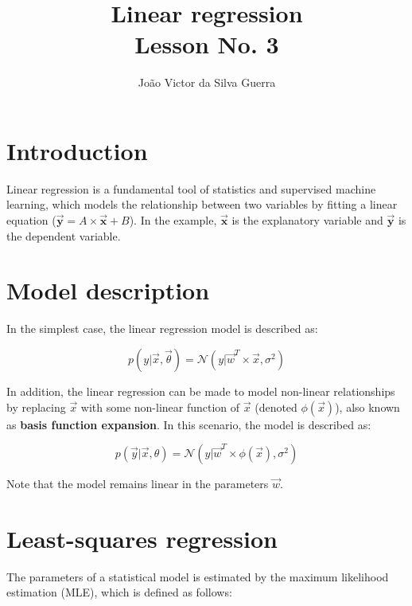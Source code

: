 \documentclass{article}
\begin{document}
\title{Linear regression\\\normalsize Lesson No. 3}
\author{Jo\~ao Victor da Silva Guerra}

\maketitle

\section{Introduction}

Linear regression is a fundamental tool of statistics and supervised machine learning, which models the relationship between two variables by fitting a linear equation ($\vec{\textbf{y}} = A \times \vec{\textbf{x}} + B$). In the example, $\vec{\textbf{x}}$ is the explanatory variable and $\vec{\textbf{y}}$ is the dependent variable.

\section{Model description}

In the simplest case, the linear regression model is described as:

\begin{equation}
  p(y|\vec{x},\vec{\theta}) = \mathcal{N} (y| \vec{w}^T \times \vec{x}, \sigma^2)
\end{equation}

In addition, the linear regression can be made to model non-linear relationships by replacing $\vec{x}$ with some non-linear function of $\vec{x}$ (denoted $\phi(\vec{x})$), also known as \textbf{basis function expansion}. In this scenario, the model is described as:

\begin{equation}
  p(\vec{y}|\vec{x},\theta) = \mathcal{N} (y|\vec{w}^T \times \phi(\vec{x}), \sigma^2)
\end{equation}

Note that the model remains linear in the parameters $\vec{w}$.

\section{Least-squares regression}

The parameters of a statistical model is estimated by the maximum likelihood estimation (MLE), which is defined as follows:
\end{document}
